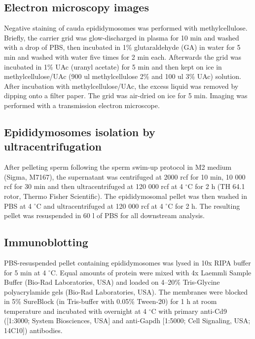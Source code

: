 \documentclass[12pt,twoside]{reedthesis}
\begin{document}
\hypertarget{electron-microscopy-images}{%
\subsection{Electron microscopy images}\label{electron-microscopy-images}}

Negative staining of cauda epididymosomes was performed with
methylcellulose. Briefly, the carrier grid was glow-discharged in plasma
for 10 min and washed with a drop of PBS, then incubated in 1\%
glutaraldehyde (GA) in water for 5 min and washed with water five times
for 2 min each. Afterwards the grid was incubated in 1\% UAc (uranyl
acetate) for 5 min and then kept on ice in methylcellulose/UAc (900 ul
methylcellulose 2\% and 100 ul 3\% UAc) solution. After incubation with
methylcellulose/UAc, the excess liquid was removed by dipping onto a
filter paper. The grid was air-dried on ice for 5 min. Imaging was
performed with a transmission electron microscope.

\hypertarget{epididymosomes-isolation-by-ultracentrifugation}{%
\subsection{Epididymosomes isolation by ultracentrifugation}\label{epididymosomes-isolation-by-ultracentrifugation}}

After pelleting sperm following the sperm swim-up protocol in M2 medium
(Sigma, M7167), the supernatant was centrifuged at 2000 rcf for 10 min,
10 000 rcf for 30 min and then ultracentrifuged at 120 000 rcf at 4
\(^{\circ}\)C for 2 h (TH 64.1 rotor, Thermo Fisher Scientific). The
epididymosomal pellet was then washed in PBS at 4 \(^{\circ}\)C and
ultracentrifuged at 120 000 rcf at 4 \(^{\circ}\)C for 2 h. The resulting
pellet was resuspended in 60 \textmu l of PBS for all downstream
analysis.

\hypertarget{immunoblotting}{%
\subsection{Immunoblotting}\label{immunoblotting}}

PBS-resuspended pellet containing epididymosomes was lysed in 10x RIPA
buffer for 5 min at 4 \(^{\circ}\)C. Equal amounts of protein were mixed
with 4x Laemmli Sample Buffer (Bio-Rad Laboratories, USA) and loaded on
4--20\% Tris-Glycine polyacrylamide gels (Bio-Rad Laboratories, USA). The
membranes were blocked in 5\% SureBlock (in Tris-buffer with 0.05\%
Tween-20) for 1 h at room temperature and incubated with overnight at 4
\(^{\circ}\)C with primary anti-Cd9 ({[}1:3000; System Biosciences, USA{]} and
anti-Gapdh {[}1:5000; Cell Signaling, USA; 14C10{]}) antibodies.
\end{document}
